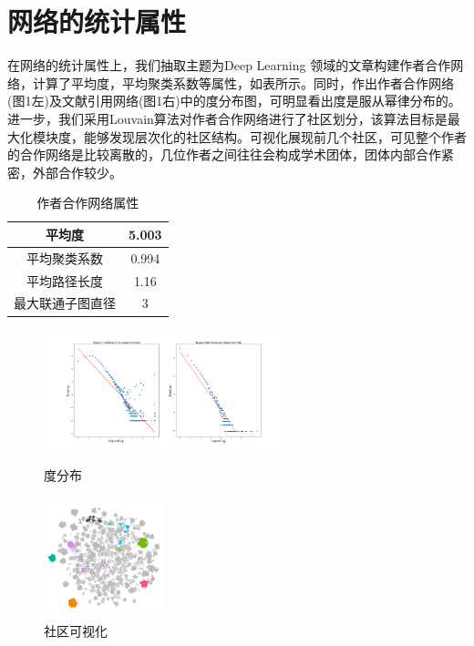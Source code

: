 \documentclass{bmvc2k}
\begin{document}
\section{网络的统计属性}
在网络的统计属性上，我们抽取主题为Deep Learning 领域的文章构建作者合作网络，计算了平均度，平均聚类系数等属性，如表所示。同时，作出作者合作网络(图1左)及文献引用网络(图1右)中的度分布图，可明显看出度是服从幂律分布的。\\
\indent 进一步，我们采用Louvain算法对作者合作网络进行了社区划分，该算法目标是最大化模块度，能够发现层次化的社区结构。可视化展现前几个社区，可见整个作者的合作网络是比较离散的，几位作者之间往往会构成学术团体，团体内部合作紧密，外部合作较少。
\begin{table}[h]
\begin{center}
\begin{tabular}{|c|c| } 
	\hline 
	平均度 &5.003\\ 
	\hline
	平均聚类系数& 0.994\\ 
	\hline 
	平均路径长度 & 1.16 \\ 
	\hline 
	最大联通子图直径 &3 \\ 
	\hline 	
\end{tabular} 
\end{center}
\caption{作者合作网络属性}
\end{table}

\begin{figure}[htbp]
\centering
\begin{minipage}[t]{0.48\textwidth}
\centering
\includegraphics[width=7cm]{images/degee_dis.png}
\caption{度分布}
\end{minipage}
\begin{minipage}[t]{0.48\textwidth}
\centering
\includegraphics[width=3.5cm]{images/community.png}
\caption{社区可视化}
\end{minipage}
\end{figure}
\end{document}
